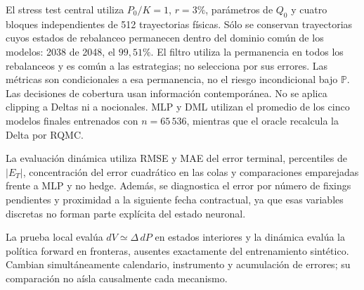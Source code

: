 El stress test central utiliza $P_0/K=1$, $r=3\%$, parámetros de $Q_0$ y cuatro
bloques independientes de 512 trayectorias físicas. Sólo se conservan trayectorias
cuyos estados de rebalanceo permanecen dentro del dominio común de los modelos:
2038 de 2048, el $99{,}51\%$. El filtro utiliza la permanencia en todos los
rebalanceos y es común a las estrategias; no selecciona por sus errores.
Las métricas son condicionales a esa permanencia, no el riesgo incondicional bajo
$\mathbb P$. Las decisiones de cobertura usan información contemporánea.
No se aplica clipping a Deltas ni a nocionales. MLP y DML utilizan el promedio de
los cinco modelos finales entrenados con $n=65\,536$, mientras que el oracle
recalcula la Delta por RQMC.

La evaluación dinámica utiliza RMSE y MAE del error terminal, percentiles de
$|E_T|$, concentración del error cuadrático en las colas y comparaciones
emparejadas frente a MLP y no hedge. Además, se diagnostica el error por número
de fixings pendientes y proximidad a la siguiente fecha contractual, ya que esas
variables discretas no forman parte explícita del estado neuronal.

La prueba local evalúa $dV\simeq\Delta\,dP$ en estados interiores y la dinámica
evalúa la política forward en fronteras, ausentes exactamente del entrenamiento
sintético. Cambian simultáneamente calendario, instrumento y acumulación de errores;
su comparación no aísla causalmente cada mecanismo.
